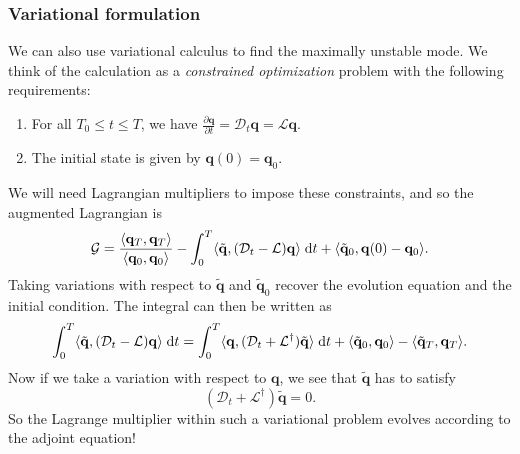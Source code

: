 \documentclass[a4paper]{article}
\begin{document}
%

\subsubsection*{Variational formulation}
We can also use variational calculus to find the maximally unstable mode. We think of the calculation as a \emph{constrained optimization} problem with the following requirements:
\begin{enumerate}
  \item For all $T_0 \leq t \leq T$, we have $\frac{\partial \mathbf{q}}{\partial t} = \mathcal{D}_t \mathbf{q} = \mathcal{L} \mathbf{q}$.
  \item The initial state is given by $\mathbf{q}(0) = \mathbf{q}_0$.
\end{enumerate}
We will need Lagrangian multipliers to impose these constraints, and so the augmented Lagrangian is
\[
  \mathcal{G} = \frac{\langle \mathbf{q}_T, \mathbf{q}_T\rangle}{\langle \mathbf{q}_0, \mathbf{q}_0\rangle} - \int_0^T \langle \tilde{\mathbf{q}}, (\mathcal{D}_t - \mathcal{L}) \mathbf{q}\rangle \;\mathrm{d} t + \langle \tilde{\mathbf{q}}_0, \mathbf{q}(0) - \mathbf{q}_0\rangle.
\]
Taking variations with respect to $\tilde{\mathbf{q}}$ and $\tilde{\mathbf{q}}_0$ recover the evolution equation and the initial condition. The integral can then be written as
\[
  \int_0^T \langle \tilde{\mathbf{q}}, (\mathcal{D}_t - \mathcal{L})\mathbf{q}\rangle \;\mathrm{d} t = \int_0^T \langle \mathbf{q}, (\mathcal{D}_t + \mathcal{L}^\dagger) \tilde{\mathbf{q}}\rangle \;\mathrm{d} t + \langle \tilde{\mathbf{q}}_0, \mathbf{q}_0\rangle - \langle \tilde{\mathbf{q}}_T, \mathbf{q}_T\rangle.
\]
Now if we take a variation with respect to $\mathbf{q}$, we see that $\tilde{\mathbf{q}}$ has to satisfy
\[
  (\mathcal{D}_t + \mathcal{L}^\dagger) \tilde{\mathbf{q}} = 0.
\]
So the Lagrange multiplier within such a variational problem evolves according to the adjoint equation!
\end{document}
